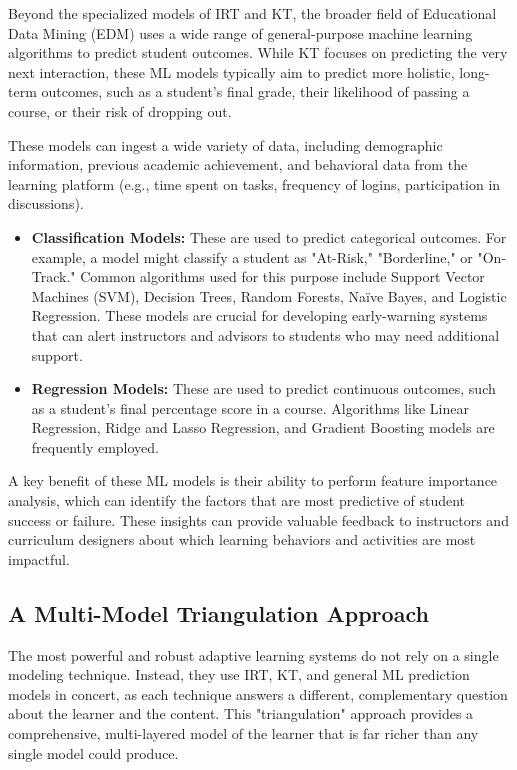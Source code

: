 \documentclass{article}
\begin{document}
Beyond the specialized models of IRT and KT, the broader field of Educational Data Mining (EDM) uses a wide range of general-purpose machine learning algorithms to predict student outcomes.\cite{84, 85} While KT focuses on predicting the very next interaction, these ML models typically aim to predict more holistic, long-term outcomes, such as a student's final grade, their likelihood of passing a course, or their risk of dropping out.\cite{86}

These models can ingest a wide variety of data, including demographic information, previous academic achievement, and behavioral data from the learning platform (e.g., time spent on tasks, frequency of logins, participation in discussions).\cite{85, 86}

\begin{itemize}
    \item \textbf{Classification Models:} These are used to predict categorical outcomes. For example, a model might classify a student as "At-Risk," "Borderline," or "On-Track." Common algorithms used for this purpose include Support Vector Machines (SVM), Decision Trees, Random Forests, Naïve Bayes, and Logistic Regression.\cite{86, 87, 88, 89} These models are crucial for developing early-warning systems that can alert instructors and advisors to students who may need additional support.\cite{85}
    \item \textbf{Regression Models:} These are used to predict continuous outcomes, such as a student's final percentage score in a course. Algorithms like Linear Regression, Ridge and Lasso Regression, and Gradient Boosting models are frequently employed.\cite{87, 88}
\end{itemize}

A key benefit of these ML models is their ability to perform feature importance analysis, which can identify the factors that are most predictive of student success or failure.\cite{85, 89} These insights can provide valuable feedback to instructors and curriculum designers about which learning behaviors and activities are most impactful.

\subsection{A Multi-Model Triangulation Approach}

The most powerful and robust adaptive learning systems do not rely on a single modeling technique. Instead, they use IRT, KT, and general ML prediction models in concert, as each technique answers a different, complementary question about the learner and the content. This "triangulation" approach provides a comprehensive, multi-layered model of the learner that is far richer than any single model could produce.
\end{document}
